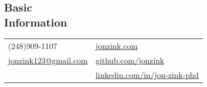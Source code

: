 \documentclass[margin,line, 12pt]{res}
\begin{document}
\begin{spacing}{0.98}	


\begin{resume}
\vspace*{-2mm}
\section{Basic\\Information}
\begin{tabular}{@{}p{4.75in}p{4in}}
  (248)909-1107 &  \href{https://www.jonzink.com}{jonzink.com}  \\
  \href{mailto:jonzink123@gmail.com}{jonzink123@gmail.com} & \href{https://github.com/jonzink}{github.com/jonzink} \\
  
  & \href{https://www.linkedin.com/in/jon-zink-phd/}{linkedin.com/in/jon-zink-phd} \\
\end{tabular}
\vspace*{-0.2in}



\end{resume}
\end{spacing}
\end{document}
